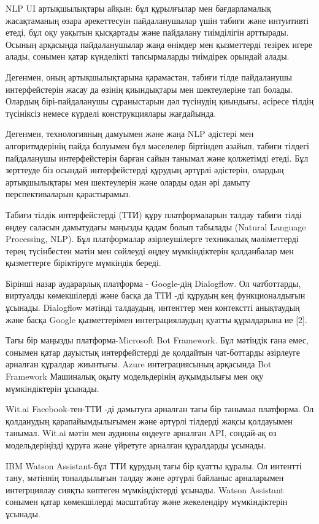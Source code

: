 NLP UI артықшылықтары айқын: бұл құрылғылар мен бағдарламалық
жасақтаманың өзара әрекеттесуін пайдаланушылар үшін табиғи және
интуитивті етеді, бұл оқу уақытын қысқартады және пайдалану тиімділігін
арттырады. Осының арқасында пайдаланушылар жаңа өнімдер мен қызметтерді
тезірек игере алады, сонымен қатар күнделікті тапсырмаларды тиімдірек
орындай алады.

Дегенмен, оның артықшылықтарына қарамастан, табиғи тілде пайдаланушы
интерфейстерін жасау да өзінің қиындықтары мен шектеулеріне тап болады.
Олардың бірі-пайдаланушы сұраныстарын дәл түсінудің қиындығы, әсіресе
тілдің түсініксіз немесе күрделі конструкциялары жағдайында.

Дегенмен, технологияның дамуымен және жаңа NLP әдістері мен
алгоритмдерінің пайда болуымен бұл мәселелер біртіндеп азайып, табиғи
тілдегі пайдаланушы интерфейстерін барған сайын танымал және қолжетімді
етеді. Бұл зерттеуде біз осындай интерфейстерді құрудың әртүрлі
әдістерін, олардың артықшылықтары мен шектеулерін және оларды одан әрі
дамыту перспективаларын қарастырамыз.

Табиғи тілдік интерфейстерді (ТТИ) құру платформаларын талдау табиғи
тілді өңдеу саласын дамытудағы маңызды қадам болып табылады (Natural
Language Processing, NLP). Бұл платформалар әзірлеушілерге техникалық
мәліметтерді терең түсінбестен мәтін мен сөйлеуді өңдеу мүмкіндіктерін
қолданбалар мен қызметтерге біріктіруге мүмкіндік береді.

Бірінші назар аударарлық платформа - Google-дің Dialogflow. Ол
чатботтарды, виртуалды көмекшілерді және басқа да ТТИ -ді құрудың кең
функционалдығын ұсынады. Dialogflow мәтінді талдаудың, интенттер мен
контекстті анықтаудың және басқа Google қызметтерімен интеграциялаудың
қуатты құралдарына ие {[}2{]}.

Тағы бір маңызды платформа-Microsoft Bot Framework. Бұл мәтіндік ғана
емес, сонымен қатар дауыстық интерфейстерді де қолдайтын чат-боттарды
әзірлеуге арналған құралдар жиынтығы. Azure интеграциясының арқасында
Bot Framework Машиналық оқыту модельдерінің ауқымдылығы мен оқу
мүмкіндіктерін ұсынады.

Wit.ai Facebook-тен-ТТИ -ді дамытуға арналған тағы бір танымал
платформа. Ол қолданудың қарапайымдылығымен және әртүрлі тілдерді жақсы
қолдауымен танымал. Wit.ai мәтін мен аудионы өңдеуге арналған API,
сондай-ақ өз модельдеріңізді құруға және үйретуге арналған құралдарды
ұсынады.

IBM Watson Assistant-бұл ТТИ құрудың тағы бір қуатты құралы. Ол интентті
тану, мәтіннің тоналдылығын талдау және әртүрлі байланыс арналарымен
интегрциялау сияқты көптеген мүмкіндіктерді ұсынады. Watson Assistant
сонымен қатар көмекшілерді масштабтау және жекелендіру мүмкіндіктерін
ұсынады.

